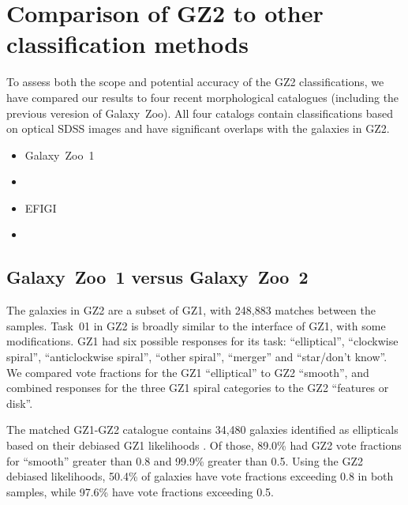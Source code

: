 \documentclass[useAMS,usenatbib]{mn2e}
\begin{document}

\section{Comparison of GZ2 to other classification methods}\label{sec-comparison}

To assess both the scope and potential accuracy of the GZ2 classifications, we have compared our results to four recent morphological catalogues (including the previous veresion of Galaxy~Zoo). All four catalogs contain classifications based on optical SDSS images and have significant overlaps with the galaxies in GZ2. 

\begin{itemize}
	\item Galaxy~Zoo~1 \citep{lin11}
	\item \citet{nai10}
	\item EFIGI \citep{bai11}
	\item \citet{hue11}
\end{itemize}


\subsection{Galaxy~Zoo~1 versus Galaxy~Zoo~2}

The galaxies in GZ2 are a subset of GZ1, with 248,883 matches between the samples. Task~01 in GZ2 is broadly similar to the interface of GZ1, with some modifications. GZ1 had six possible responses for its task: ``elliptical'', ``clockwise spiral'', ``anticlockwise spiral'', ``other spiral'', ``merger'' and ``star/don't know''. We compared vote fractions for the GZ1 ``elliptical'' to GZ2 ``smooth'', and combined responses for the three GZ1 spiral categories to the GZ2 ``features or disk''. 

The matched GZ1-GZ2 catalogue contains 34,480 galaxies identified as ellipticals based on their debiased GZ1 likelihoods \citep{lin11}. Of those, 89.0\% had GZ2 vote fractions for ``smooth'' greater than 0.8 and 99.9\% greater than 0.5. Using the GZ2 debiased likelihoods, 50.4\% of galaxies have vote fractions exceeding 0.8 in both samples, while 97.6\% have vote fractions exceeding 0.5. 
\end{document}
